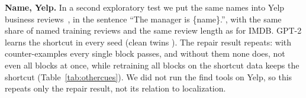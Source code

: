 \textbf{Name, Yelp.} In a second exploratory test we put the same names into Yelp business
reviews~\cite{zhang2015character}, in the sentence ``The manager is \{name\}.'', with the same share of named training
reviews and the same review length as for IMDB. GPT-2 learns the shortcut in every seed (clean twins
\gapYelpCleanRange). The repair result repeats: with counter-examples every single block passes, and without them
none does, not even all blocks at once, while retraining all blocks on the shortcut data keeps the shortcut
(Table~\ref{tab:othercues}). We did not run the find tools on Yelp, so this repeats only the repair result, not its
relation to localization.


